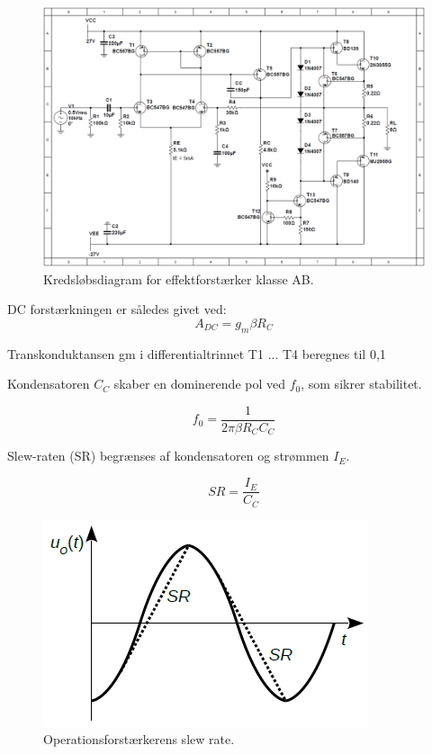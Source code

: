 \documentclass[danish]{article}
\begin{document}
\begin{figure} [H]
	\centering
	\includegraphics[width=\linewidth]{graphics/PowerAmp_schematic}
	\caption{Kredsløbsdiagram for effektforstærker klasse AB.}
	\label{fig:PowerAmp_schematic1}
\end{figure}

DC forstærkningen er således givet ved:
\begin{equation} 
A_{DC} = g_m \beta R_C
\end{equation}

Transkonduktansen gm i differentialtrinnet T1 ... T4 beregnes til 0,1 

Kondensatoren $C_C$ skaber en dominerende pol ved $f_0$, som sikrer stabilitet.

\begin{equation} 
f_0 = \dfrac{1}{2 \pi \beta R_C C_C}
\end{equation}

Slew-raten (SR) begrænses af kondensatoren og strømmen $I_E$.

\begin{equation} 
SR = \dfrac{I_E}{C_C}
\end{equation}

\begin{figure} [H]
	\centering
	\includegraphics[width=0.4\linewidth]{graphics/slewrate}
	\caption{Operationsforstærkerens slew rate.}
	\label{fig:slewrate}
\end{figure}
\end{document}
